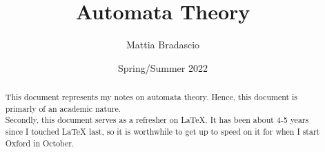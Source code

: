 \documentclass[12pt, letterpaper]{article}
\title{Automata Theory}
\author{Mattia Bradascio}
\date{Spring/Summer 2022}
\begin{document}
\begin{titlepage}
\maketitle
\end{titlepage}

\begin{abstract}

    This document represents my notes on automata theory.
    Hence, this document is primarly of an academic nature. \\ 
    \indent Secondly, this document serves as a refresher on LaTeX. 
    It has been about 4-5 years since I touched LaTeX last,
    so it is worthwhile to get up to speed on it for when I start Oxford in October.

\end{abstract}
\end{document}
